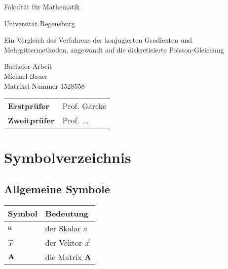 
\pagestyle{empty}

\clearscrheadings\clearscrplain

\begin{center}
\begin{Huge}
Fakultät für Mathematik\\
\vspace{3mm}
\end{Huge}{\Large Universität Regensburg}\\

\vspace{20mm}
\begin{Large}
Ein Vergleich des Verfahrens der konjugierten Gradienten und Mehrgittermethoden, angewandt auf die diskretisierte Poisson-Gleichung\\
\end{Large}
\vspace{8mm}
Bachelor-Arbeit\\
\vspace{0.4cm}
\vspace{2 cm}
Michael Bauer \\
Matrikel-Nummer 1528558\\
\vspace{8cm}
\begin{tabular}{ll}
{\bf Erstprüfer}&Prof. Garcke\\
{\bf Zweitprüfer}&Prof. ...\\
\end{tabular}

\end{center}
\clearpage


\pagestyle{useheadings} %

\tableofcontents
\listoffigures
\listoftables

\chapter*{Symbolverzeichnis}\label{s.sym}
\section*{Allgemeine Symbole}\label{s.sym.alg}
\begin{flushleft}\begin{tabularx}{\textwidth}{l|X}
Symbol & Bedeutung\\\hline
$a$ & der Skalar $a$ \\
$\vec{x}$ & der Vektor $\vec{x}$\\
${\textbf{A}}$ & die Matrix ${\textbf{A}}$\\
\end{tabularx}\end{flushleft}




